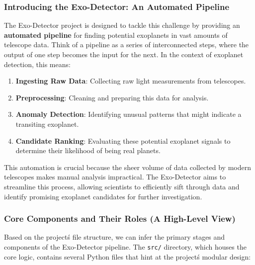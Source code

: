 \documentclass{article}
\begin{document}
\subsubsection{Introducing the Exo-Detector: An Automated Pipeline}

The Exo-Detector project is designed to tackle this challenge by providing an \textbf{automated pipeline} for finding potential exoplanets in vast amounts of telescope data. Think of a pipeline as a series of interconnected steps, where the output of one step becomes the input for the next. In the context of exoplanet detection, this means: 

\begin{enumerate}
    \item \textbf{Ingesting Raw Data}: Collecting raw light measurements from telescopes.
    \item \textbf{Preprocessing}: Cleaning and preparing this data for analysis.
    \item \textbf{Anomaly Detection}: Identifying unusual patterns that might indicate a transiting exoplanet.
    \item \textbf{Candidate Ranking}: Evaluating these potential exoplanet signals to determine their likelihood of being real planets.
\end{enumerate}

This automation is crucial because the sheer volume of data collected by modern telescopes makes manual analysis impractical. The Exo-Detector aims to streamline this process, allowing scientists to efficiently sift through data and identify promising exoplanet candidates for further investigation.

\subsubsection{Core Components and Their Roles (A High-Level View)}

Based on the project\'s file structure, we can infer the primary stages and components of the Exo-Detector pipeline. The \texttt{src/} directory, which houses the core logic, contains several Python files that hint at the project\'s modular design:
\end{document}
